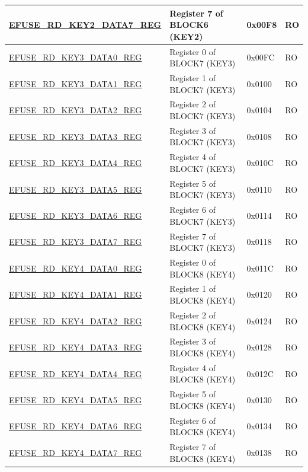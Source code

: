\begin{longtable}{ | p{6.8cm} | p{7cm} | p{1.3cm} | p{1.2cm} | }
\hyperref[regdesc:EFUSERDKEY2DATA7REG]{EFUSE\_RD\_KEY2\_DATA7\_REG} & Register 7 of BLOCK6 (KEY2) & 0x00F8 & RO \\ \hline
\hyperref[regdesc:EFUSERDKEY3DATA0REG]{EFUSE\_RD\_KEY3\_DATA0\_REG} & Register 0 of BLOCK7 (KEY3) & 0x00FC & RO \\ \hline
\hyperref[regdesc:EFUSERDKEY3DATA1REG]{EFUSE\_RD\_KEY3\_DATA1\_REG} & Register 1 of BLOCK7 (KEY3) & 0x0100 & RO \\ \hline
\hyperref[regdesc:EFUSERDKEY3DATA2REG]{EFUSE\_RD\_KEY3\_DATA2\_REG} & Register 2 of BLOCK7 (KEY3) & 0x0104 & RO \\ \hline
\hyperref[regdesc:EFUSERDKEY3DATA3REG]{EFUSE\_RD\_KEY3\_DATA3\_REG} & Register 3 of BLOCK7 (KEY3) & 0x0108 & RO \\ \hline
\hyperref[regdesc:EFUSERDKEY3DATA4REG]{EFUSE\_RD\_KEY3\_DATA4\_REG} & Register 4 of BLOCK7 (KEY3) & 0x010C & RO \\ \hline
\hyperref[regdesc:EFUSERDKEY3DATA5REG]{EFUSE\_RD\_KEY3\_DATA5\_REG} & Register 5 of BLOCK7 (KEY3) & 0x0110 & RO \\ \hline
\hyperref[regdesc:EFUSERDKEY3DATA6REG]{EFUSE\_RD\_KEY3\_DATA6\_REG} & Register 6 of BLOCK7 (KEY3) & 0x0114 & RO \\ \hline
\hyperref[regdesc:EFUSERDKEY3DATA7REG]{EFUSE\_RD\_KEY3\_DATA7\_REG} & Register 7 of BLOCK7 (KEY3) & 0x0118 & RO \\ \hline
\hyperref[regdesc:EFUSERDKEY4DATA0REG]{EFUSE\_RD\_KEY4\_DATA0\_REG} & Register 0 of BLOCK8 (KEY4) & 0x011C & RO \\ \hline
\hyperref[regdesc:EFUSERDKEY4DATA1REG]{EFUSE\_RD\_KEY4\_DATA1\_REG} & Register 1 of BLOCK8 (KEY4) & 0x0120 & RO \\ \hline
\hyperref[regdesc:EFUSERDKEY4DATA2REG]{EFUSE\_RD\_KEY4\_DATA2\_REG} & Register 2 of BLOCK8 (KEY4) & 0x0124 & RO \\ \hline
\hyperref[regdesc:EFUSERDKEY4DATA3REG]{EFUSE\_RD\_KEY4\_DATA3\_REG} & Register 3 of BLOCK8 (KEY4) & 0x0128 & RO \\ \hline
\hyperref[regdesc:EFUSERDKEY4DATA4REG]{EFUSE\_RD\_KEY4\_DATA4\_REG} & Register 4 of BLOCK8 (KEY4) & 0x012C & RO \\ \hline
\hyperref[regdesc:EFUSERDKEY4DATA5REG]{EFUSE\_RD\_KEY4\_DATA5\_REG} & Register 5 of BLOCK8 (KEY4) & 0x0130 & RO \\ \hline
\hyperref[regdesc:EFUSERDKEY4DATA6REG]{EFUSE\_RD\_KEY4\_DATA6\_REG} & Register 6 of BLOCK8 (KEY4) & 0x0134 & RO \\ \hline
\hyperref[regdesc:EFUSERDKEY4DATA7REG]{EFUSE\_RD\_KEY4\_DATA7\_REG} & Register 7 of BLOCK8 (KEY4) & 0x0138 & RO \\ \hline

\end{longtable}
